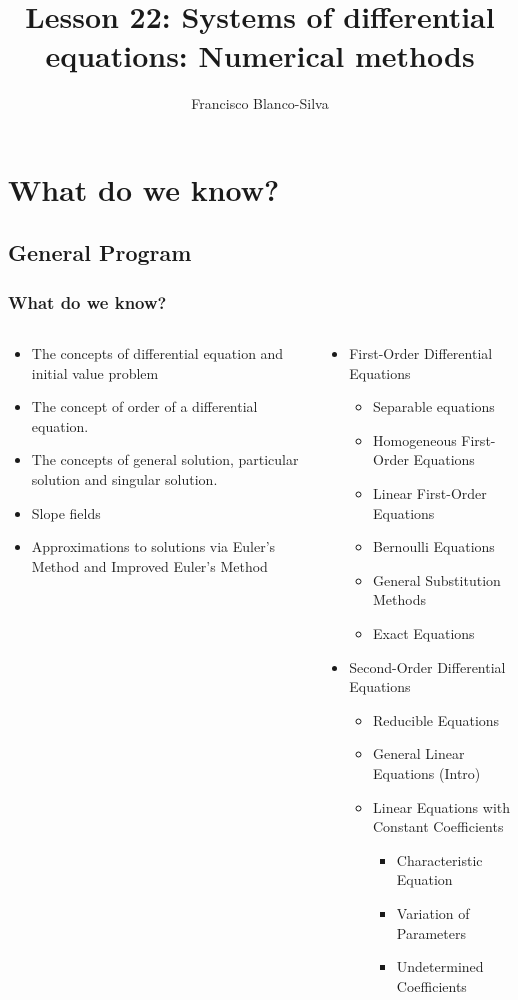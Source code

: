 \documentclass[9pt,xcolor=x11names,compress]{beamer}
\author[Francisco Blanco-Silva]{Francisco Blanco-Silva}
\institute[USC]{University of South Carolina}
\date{ 
\pgfdeclarelindenmayersystem{bush}{
	\rule{F -> FF[-F+F][+F-F]}
}
\begin{center}
\begin{tikzpicture}[color=DeepSkyBlue4,rotate=90]
    \draw [l-system={bush, axiom=F, order=5, step=1.6pt, angle=60}]
    lindenmayer system; 
	\end{tikzpicture}	
\end{center}
}
\title{Lesson 22: Systems of differential equations: Numerical methods}
\begin{document}
\frame{\titlepage}

\section{What do we know?}
\subsection{General Program}

\begin{frame}\frametitle{What do we know?}
\begin{columns}[T]
\begin{column}{0.45\linewidth}
\begin{itemize}
\item The concepts of \alert{differential equation} and \alert{initial value problem}
\item The concept of \alert{order} of a differential equation.
\item The concepts of \alert{general solution}, \alert{particular solution} and \alert{singular solution}.
\item \alert{Slope fields}
\item Approximations to solutions via \alert{Euler's Method} and \alert{Improved Euler's Method}
\end{itemize} 
\end{column}
\begin{column}{0.55\linewidth}
\begin{itemize}
\item First-Order Differential Equations
\begin{itemize}
\item Separable equations 
\item Homogeneous First-Order Equations 
\item Linear First-Order Equations 
\item Bernoulli Equations 
\item General Substitution Methods
\item Exact Equations 
\end{itemize}
\item Second-Order Differential Equations
\begin{itemize}
	\item Reducible Equations
	\item General Linear Equations (Intro)
	\item Linear Equations with Constant Coefficients
	\begin{itemize}
		\item Characteristic Equation
		\item Variation of Parameters
		\item Undetermined Coefficients
	\end{itemize}
\end{itemize}
\end{itemize}
\end{column}
\end{columns}
\end{frame}
\end{document}
